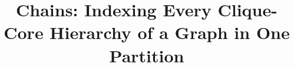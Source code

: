 \documentclass[sigconf, anonymous, nonacm]{acmart}
\begin{document}
\title{Chains: Indexing Every Clique-Core Hierarchy of a Graph in One Partition}

\begin{abstract}

\end{abstract}

\maketitle














\end{document}
